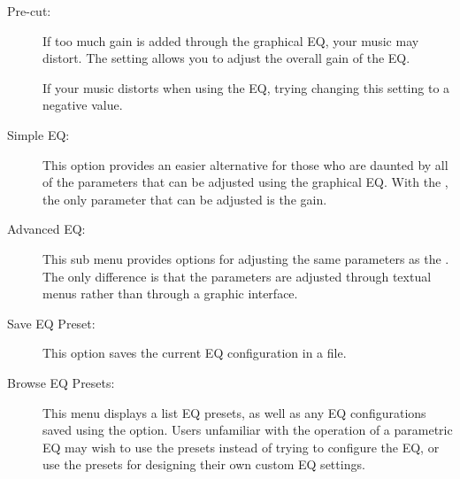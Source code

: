 {\begin {description}
  \item[Pre-cut:]
  If too much gain is added through the graphical EQ, your music may distort.
  The  setting allows you to adjust the overall gain of the EQ.

  If your music distorts when using the EQ, trying changing this setting to a 
  negative value.

\item[Simple EQ:]
This option provides an easier alternative for those who are daunted by all of
the parameters that can be adjusted using the graphical EQ. With the
, the only parameter that can be adjusted is the gain.

\item[Advanced EQ:]
This sub menu provides options for adjusting the same parameters as the
. The only difference is that the parameters are
adjusted through textual menus rather than through a graphic interface.

\item[Save EQ Preset:]
This option saves the current EQ configuration in a  file.

\item[Browse EQ Presets:]
This menu displays a list EQ presets, as well as any EQ configurations saved
using the  option. Users unfamiliar with the
operation of a parametric EQ may wish to use the presets instead of trying to
configure the EQ, or use the presets for designing their own custom EQ
settings.

\end{description}
}


